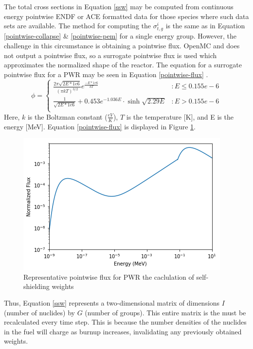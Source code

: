\documentclass{article}
\begin{document}
The total cross sections in Equation \ref{ssw} may be computed from continuous energy
pointwise ENDF or ACE formatted data for those species where such data sets are available.
The method for computing the  $\sigma_{t,g}^i$ is the same as in Equation
\ref{pointwise-collapse} \& \ref{pointwise-pem} for a single energy group.  However,
the challenge in this circumstance is obtaining a pointwise flux. OpenMC and does not output
a pointwise flux, so a surrogate pointwise flux is used which approximates the normalized shape
of the reactor. The equation for a surrogate pointwise flux for a PWR may be seen in
Equation \ref{pointwise-flux} \cite{spectrum}.
\begin{equation}
\label{pointwise-flux}
\phi =
\begin{cases}
    \frac{2\pi\sqrt{2E*1e6}}{(\pi kT)^{3/2}}e^{\frac{-E*1e6}{kT}} & : E\leq 0.155e-6 \\
    \frac{1}{\sqrt{2E*1e6}} + 0.453e^{-1.036E}\cdot\sinh{\sqrt{2.29E}} & : E > 0.155e-6 \\
\end{cases}
\end{equation}
Here, $k$ is the Boltzman constant ($\frac{eV}{K}$), $T$ is the temperature [K],
and E is the energy [MeV]. Equation \ref{pointwise-flux} is displayed in
Figure \ref{fig:therm}.
\begin{figure}[h]
  \center
  \includegraphics[scale=0.6]{thermspec.png}
  \caption{Representative pointwise flux for PWR the caclulation of self-shielding weights}
  \label{fig:therm}
\end{figure}

Thus, Equation \ref{ssw} represents a two-dimensional matrix of dimensions
$I$ (number of nuclides) by $G$ (number of groups). This entire matrix is the
must be recalculated every time step. This is because the number densities of the nuclides
in the fuel will charge as burnup increases, invalidating any previously obtained weights.
\end{document}

